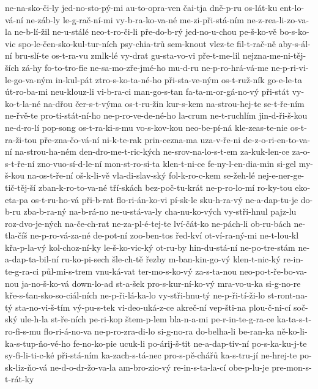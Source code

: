 {ne-na-sko-či-ly
jed-no-sto-pý-mi
au-to-opra-ven
čai-tja
dně-p-ru
os-lát-ku
ent-lo-vá-ní
ne-záb-ly
le-g-rač-ní-mi
vy-b-ra-ko-va-né
me-zi-při-stá-ním
ne-z-rea-li-zo-va-la
ne-b-lí-žil
ne-u-stálé
neo-t-ro-či-li
pře-do-b-rý
jed-no-u-chou
pe-š-ko-vě
bo-s-ko-vic
spo-le-čen-sko-kul-tur-ních
psy-chia-trů
sem-knout
vlez-te
fil-t-rač-ně
aby-s-ál-ní
bru-slí-te
os-t-ra-vu
zmlk-lé
vy-drat
gu-sta-vo-vi
pře-t-me-lil
nejzna-me-ni-těj-ších
zá-hy
fo-to-tro-fie
ne-sa-mo-zře-jmé-ho
mu-d-ru
ne-p-ro-hrá-vá-me
ne-p-ri-vi-le-go-va-ným
in-kul-pát
ztro-s-ko-ta-né-ho
při-sta-ve-ným
os-t-ruž-ník
go-e-le-ta
út-ro-ba-mi
neu-klouz-li
vi-b-ra-ci
man-go-s-tan
fa-ta-m-or-gá-no-vý
při-stát
vy-ko-t-la-né
na-dřou
čer-s-t-výma
os-t-ru-žin
kur-s-kem
na-strou-hej-te
se-t-ře-ním
ne-řvě-te
pro-ti-stát-ní-ho
ne-p-ro-ve-de-né-ho
la-crum
ne-t-ruchlím
jin-d-ři-š-kou
ne-d-ro-lí
pop-song
os-t-ra-ki-s-mu
vo-s-kov-kou
neo-be-pí-ná
kle-zeas-te-nie
os-t-ra-ži-tou
pře-zna-čo-vá-ní
ni-k-te-rak
prin-cezna-ma
uza-v-ře-ni
de-z-o-ri-en-to-va-ní
na-strou-ha-ném
den-dro-me-t-ric-kých
ne-srov-na-lo-s-t-em
za-kuk-len-ce
za-o-s-t-ře-ní
zno-vuo-sí-d-le-ní
mon-st-ro-si-ta
klen-t-ni-ce
fe-ny-l-en-dia-min
si-gel
my-š-kou
na-os-t-ře-ní
oš-k-li-vě
vla-di-slav-ský
fol-k-ro-c-kem
se-žeh-lé
nej-e-ner-ge-tič-těj-ší
zban-k-ro-to-va-né
tří-skách
bez-poč-tu-krát
ne-p-ro-lo-mí
ro-ky-tou
eko-eta-pa
os-t-ru-ho-vá
při-b-rat
flo-ri-án-ko-vi
pí-sk-le
sku-h-ra-vý
ne-a-dap-tu-je
do-b-ru
zba-b-ra-ný
na-b-rá-no
ne-u-stá-va-ly
cha-nu-ko-vých
vy-stři-hnul
pajz-lu
roz-dvo-je-ných
na-če-ch-rat
ne-za-pl-é-tej-te
lví-čát-ko
ne-pách-li
ob-ru-bách
ne-tla-číš
ne-p-ro-vá-za-né
de-pot-ní
zoo-ben-tos
řed-kví
ot-ví-ra-ný-mi
ne-t-lou-kl
křa-p-la-vý
kol-choz-ní-ky
le-š-ko-vic-ký
ot-ru-by
hin-du-stá-ní
ne-po-tre-stám
ne-a-dap-ta-bil-ní
ru-ko-pi-sech
šle-ch-tě
řezby
m-ban-kin-go-vý
klen-t-nic-ký
re-in-te-g-ra-ci
půl-mi-s-trem
vnu-ká-vat
ter-mo-s-ko-vý
za-s-ta-nou
neo-po-t-ře-bo-va-nou
ja-no-š-ko-vá
down-lo-ad
st-a-šek
pro-s-kur-ní-ko-vý
mra-vo-u-ka
si-g-no-re
kře-s-ťan-sko-so-ciál-ních
ne-p-ři-lá-ka-lo
vy-stři-hnu-tý
ne-p-ři-tí-ži-lo
st-ront-na-tý
sta-no-vi-š-tím
vý-pu-s-tek
vi-deo-uká-z-ce
akreč-ní
vep-šti-na
plou-č-ni-cí
soč-ský
ule-h-la
st-ře-ních
pe-ri-kop
štem-p-lem
bla-n-a-mi
pe-r-in-te-g-ra-ce
ka-ta-s-t-ro-fi-s-mu
flo-ri-á-no-va
ne-p-ro-zra-di-lo
si-g-no-ra
do-belha-li
be-ran-ka
ně-ko-li-ka-s-tup-ňo-vé-ho
fe-no-ko-pie
ucuk-li
po-árij-š-tit
ne-a-dap-tiv-ní
po-s-ka-ku-j-te
sy-fi-li-ti-c-ké
při-stá-ním
ka-zach-s-tá-nec
pro-s-pě-chářů
ka-s-tru-jí
ne-hrej-te
po-sk-liz-ňo-vá
ne-d-o-dr-žo-va-la
am-bro-zio-vý
re-in-s-ta-la-cí
obe-p-lu-je
pre-mon-s-t-rát-ky
}
